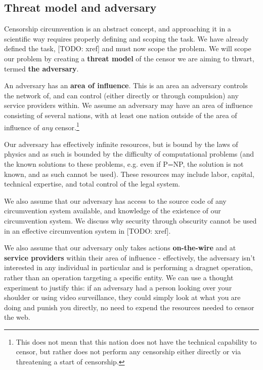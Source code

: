 \documentclass[12pt]{report}
\begin{document}
\subsection{Threat model and adversary}
\label{adversary}

Censorship circumvention is an abstract concept, and approaching it in a scientific way requires properly defining and scoping the task. We have already defined the task, [TODO: xref] and must now scope the problem. We will scope our problem by creating a \textbf{threat model} of the censor we are aiming to thwart, termed \textbf{the adversary}.

An adversary has an \textbf{area of influence}. This is an area an adversary controls the network of, and can control (either directly or through compulsion) any service providers within. We assume an adversary may have an area of influence consisting of several nations, with at least one nation outside of the area of influence of \emph{any} censor.\footnote{This does not mean that this nation does not have the technical capability to censor, but rather does not perform any censorship either directly or via threatening a start of censorship.}

Our adversary has effectively infinite resources, but is bound by the laws of physics and as such is bounded by the difficulty of computational problems (and the known solutions to these problems, e.g. even if P=NP, the solution is not known, and as such cannot be used). These resources may include labor, capital, technical expertise, and total control of the legal system.

We also assume that our adversary has access to the source code of any circumvention system available, and knowledge of the existence of our circumvention system. We discuss why security through obscurity cannot be used in an effective circumvention system in [TODO: xref].

We also assume that our adversary only takes actions \textbf{on-the-wire} and at \textbf{service providers} within their area of influence - effectively, the adversary isn't interested in any individual in particular and is performing a dragnet operation, rather than an operation targeting a specific entity. We can use a thought experiment to justify this: if an adversary had a person looking over your shoulder or using video surveillance, they could simply look at what you are doing and punish you directly, no need to expend the resources needed to censor the web.
\end{document}
